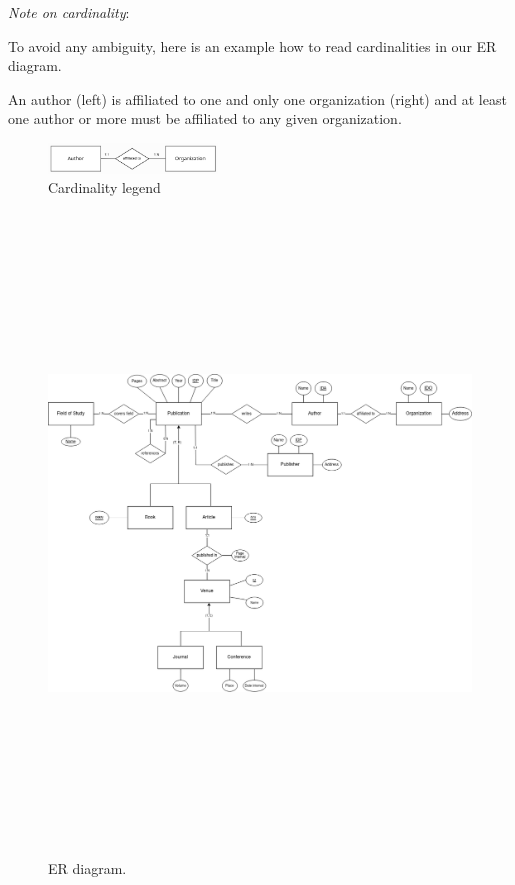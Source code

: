 \documentclass{Configuration_Files/PoliMi3i_thesis}
\begin{document}
\textit{Note on cardinality}:

To avoid any ambiguity, here is an example how to read cardinalities in our ER diagram. 

An author (left) is affiliated to one and only one organization (right) and at least one author or more must be affiliated to any given organization.

\begin{figure}[H]
    \centering
    \includegraphics[width=0.4\textwidth]{Images/legenda.png}
    \caption{Cardinality legend}
    \label{fig:quadtree}
\end{figure}
\begin{figure}[H]
    \centering
    \includegraphics[width=170mm, height = 170mm, scale = 1]{Images/ER1.png}
    \caption{ER diagram.}
    \label{fig:quadtree}
\end{figure}
\end{document}

